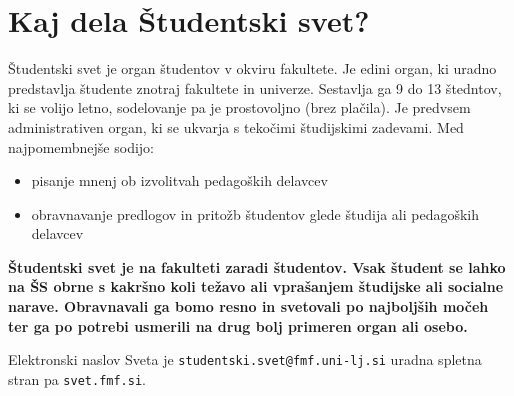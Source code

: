 \documentclass[a4paper,oneside,12pt]{article}
\title{\Title}
\author{\Author}
\date{\today}
\theoremstyle{definition}
\begin{document}

\section*{Kaj dela Študentski svet?}

Študentski svet je organ študentov v okviru fakultete. Je edini organ, ki uradno predstavlja
študente znotraj fakultete in univerze. Sestavlja ga 9 do 13 štedntov, ki se volijo letno,
sodelovanje pa je prostovoljno (brez plačila). Je predvsem administrativen organ, ki se ukvarja s
tekočimi študijskimi zadevami. Med najpomembnejše sodijo:
\begin{itemize}
  \item pisanje mnenj ob izvolitvah pedagoških delavcev
  \item obravnavanje predlogov in pritožb študentov glede študija ali pedagoških delavcev
\end{itemize}

\textbf{Študentski svet je na fakulteti zaradi študentov. Vsak študent se lahko na ŠS obrne s
kakršno koli težavo ali vprašanjem študijske ali socialne narave. Obravnavali ga bomo resno in
svetovali po najboljših močeh ter ga po potrebi usmerili na drug bolj primeren organ ali osebo.}

Elektronski naslov Sveta je \texttt{studentski.svet@fmf.uni-lj.si} uradna spletna stran pa
\texttt{svet.fmf.si}.
\end{document}
